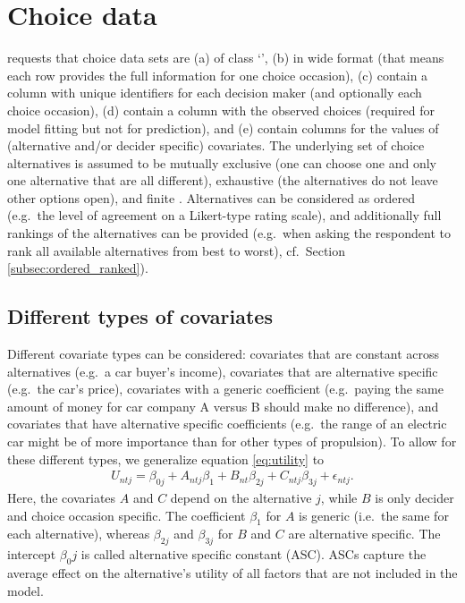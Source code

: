 \documentclass[article,shortnames]{jss}
\newcommand{\class}[1]{`\code{#1}'}
\begin{document}
\section{Choice data} \label{sec:choice_data}

 requests that choice data sets are (a) of class \class{data.frame}, (b) in wide format (that means each row provides the full information for one choice occasion), (c) contain a column with unique identifiers for each decision maker (and optionally each choice occasion), (d) contain a column with the observed choices (required for model fitting but not for prediction), and (e) contain columns for the values of (alternative and/or decider specific) covariates. The underlying set of choice alternatives is assumed to be mutually exclusive (one can choose one and only one alternative that are all different), exhaustive (the alternatives do not leave other options open), and finite \citep[Ch.\ 2]{Train:2009}. Alternatives can be considered as ordered (e.g.\ the level of agreement on a Likert-type rating scale), and additionally full rankings of the alternatives can be provided (e.g.\ when asking the respondent to rank all available alternatives from best to worst), cf.\ Section \ref{subsec:ordered_ranked}).

\subsection{Different types of covariates} \label{subsec:covariate_types}

Different covariate types can be considered: covariates that are constant across alternatives (e.g.\ a car buyer's income), covariates that are alternative specific (e.g.\ the car's price), covariates with a generic coefficient (e.g.\ paying the same amount of money for car company A versus B should make no difference), and covariates that have alternative specific coefficients (e.g.\ the range of an electric car might be of more importance than for other types of propulsion). To allow for these different types, we generalize equation \eqref{eq:utility} to
\begin{align}
  \label{eq:utility_gen}
  U_{ntj} = \beta_{0j} + A_{ntj} \beta_1 + B_{nt} \beta_{2j} + C_{ntj} \beta_{3j} + \epsilon_{ntj}.
\end{align}
Here, the covariates $A$ and $C$ depend on the alternative $j$, while $B$ is only decider and choice occasion specific. The coefficient $\beta_1$ for $A$ is generic (i.e.\ the same for each alternative), whereas $\beta_{2j}$ and $\beta_{3j}$ for $B$ and $C$ are alternative specific. The intercept $\beta_0j$ is called alternative specific constant (ASC). ASCs capture the average effect on the alternative's utility of all factors that are not included in the model.
\end{document}
